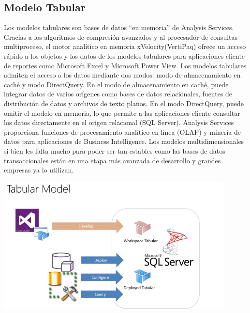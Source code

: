 \documentclass[preprint,12pt]{elsarticle}
\begin{document}
\subsection{Modelo Tabular}

Los modelos tabulares son bases de datos “en memoria” de Analysis Services. Gracias a los algoritmos de compresión avanzados y al procesador de consultas multiproceso, el motor analítico en memoria xVelocity(VertiPaq) ofrece un acceso rápido a los objetos y los datos de los modelos tabulares para aplicaciones cliente de reportes como Microsoft Excel y Microsoft Power View.
Los modelos tabulares admiten el acceso a los datos mediante dos modos: modo de almacenamiento en caché y modo DirectQuery. En el modo de almacenamiento en caché, puede integrar datos de varios orígenes como bases de datos relacionales, fuentes de distribución de datos y archivos de texto planos. En el modo DirectQuery, puede omitir el modelo en memoria, lo que permite a las aplicaciones cliente consultar los datos directamente en el origen relacional (SQL Server).
Analysis Services proporciona funciones de procesamiento analítico en línea (OLAP) y minería de datos para aplicaciones de Business Intelligence.
Los modelos multidimensionales si bien les falta mucho para poder ser tan estables como las bases de datos transaccionales están en una etapa más avanzada de desarrollo y grandes empresas ya lo utilizan.


\begin{center}
	\includegraphics[width=12cm]{./Imagenes/img1} 
\end{center}
\end{document}
